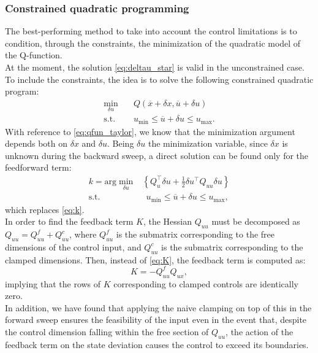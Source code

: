 \subsubsection{Constrained quadratic programming}
The best-performing method to take into account the control limitations is to condition, through the constraints, the minimization of the quadratic model of the Q-function.\\
At the moment, the solution \ref{eq:deltau_star} is valid in the unconstrained case. To include the constraints, the idea is to solve the following constrained quadratic program:
\begin{equation*}
    \begin{aligned}
        \min_{\delta u} \quad & Q(\overline{x} + \delta x, \overline{u} + \delta u) \\
        \text{s.t.} \quad & u_{\text{min}} \leq \overline{u} + \delta u \leq u_{\text{max}}.
    \end{aligned}
\end{equation*}
With reference to \ref{eq:qfun_taylor}, we know that the minimization argument depends both on $\delta x$ and $\delta u$. Being $\delta u$ the minimization variable, since $\delta x$ is unknown during the backward sweep, a direct solution can be found only for the feedforward term:
\begin{equation}
    \begin{aligned}
        k = \text{arg}\min_{\delta u} & \left\{Q_u ^\top \delta u + \frac{1}{2} \delta u^\top Q_{uu} \delta u \right\}\\
        \text{s.t.} \;& \;\,u_{\text{min}} \leq \overline{u} + \delta u \leq u_{\text{max}},
    \end{aligned} \label{eq:k_qp}
\end{equation}
which replaces \ref{eq:k}.\\
In order to find the feedback term $K$, the Hessian $Q_{uu}$ must be decomposed as $Q_{uu} = Q_{uu}^f + Q_{uu}^c$, where $Q_{uu}^f$ is the submatrix corresponding to the free dimensions of the control input, and $Q_{uu}^c$ is the submatrix corresponding to the clamped dimensions. Then, instead of \ref{eq:K}, the feedback term is computed as:
\begin{equation}
    K = -Q_{uu}^f Q_{ux}, \label{eq:K_qp}
\end{equation} 
implying that the rows of $K$ corresponding to clamped controls are identically zero.\\
In addition, we have found that applying the naive clamping on top of this in the forward sweep ensures the feasibility of the input even in the event that, despite the control dimension falling within the free section of $Q_{uu}$, the action of the feedback term on the state deviation causes the control to exceed its boundaries.

